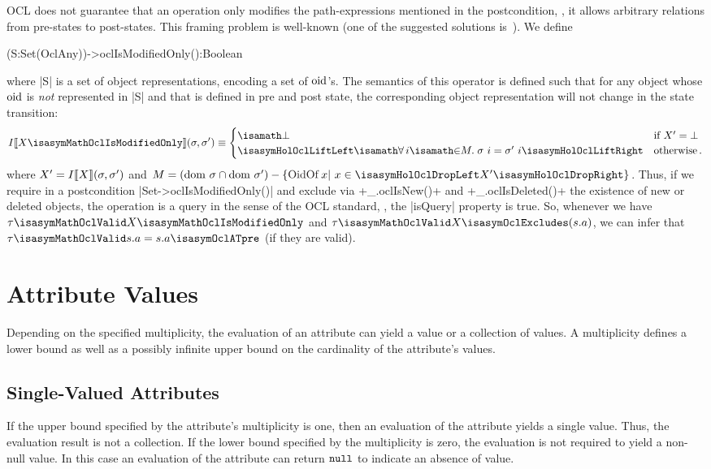 OCL does not guarantee that an operation only modifies the path-expressions
mentioned in the postcondition, \ie, it allows arbitrary relations from
pre-states to post-states.  This framing problem is well-known (one of the
suggested solutions is~\cite{kosiuczenko:specification:2006}). We define
\begin{ocl}
 (S:Set(OclAny))->oclIsModifiedOnly():Boolean
\end{ocl}
where \inlineocl|S| is a set of object representations, encoding
a set of $\mathrm{oid}$'s. The semantics of this operator is defined such that
for any object whose $\mathrm{oid}$ is \emph{not }represented in \inlineocl|S|
and that is defined in pre and post state, the corresponding object representation will not change
in the state transition:
\begin{gather*}
I\semantics{X\isasymMathOclIsModifiedOnly} (\sigma, \sigma')  \equiv
  \begin{cases}
    \isasymbottom & \text{if $X' = \bottom$}  \\
     \lift{\isasymforall i \isasymin M\spot
        \sigma~i = \sigma'~i} & \text{otherwise}\mi{.}
   \end{cases}
\end{gather*}
where $X' = I\llbracket X \rrbracket (\sigma, \sigma')$ and $M=
(\dom~\sigma\cap\dom~\sigma') - \{ \HolOclOidOf x |~x \in\drop{X'}\}$.  Thus, if
we require in a postcondition \inlineocl|Set{}->oclIsModifiedOnly()| and exclude via
\inlineocl+_.oclIsNew()+ and \inlineocl+_.oclIsDeleted()+ the existence of new
or deleted objects, the operation is a query in the sense of the OCL standard, \ie,
the \inlineocl|isQuery| property is true. So, whenever we have $ \tau
\isasymMathOclValid X\isasymMathOclIsModifiedOnly$ and $ \tau
\isasymMathOclValid X\isasymOclExcludes(s.a)$, we can infer that $\tau
\isasymMathOclValid s.a = s.a\isasymOclATpre$ (if they are valid).

\chapter{Attribute Values}\label{sec:multiplicities}
Depending on the specified multiplicity, the evaluation of an attribute can
yield a value or a collection of values. A multiplicity defines a lower bound as
well as a possibly infinite upper bound on the cardinality of the attribute's
values.

\section{Single-Valued Attributes}\label{sec:single-valued-properties}
If the upper bound specified by the attribute's multiplicity is one, then an
evaluation of the attribute yields a single value. Thus, the evaluation result
is not a collection. If the lower bound specified by the multiplicity is zero,
the evaluation is not required to yield a non-null value. In this case an
evaluation of the attribute can return $\mathtt{null}$ to indicate an
absence of value.

